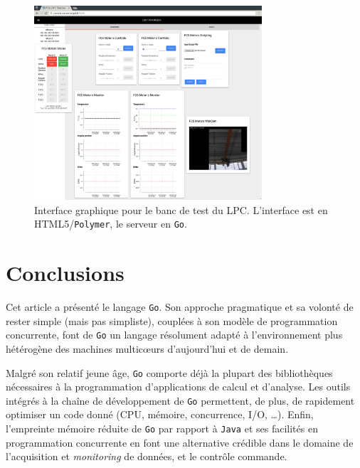 \documentclass[a4paper,french]{article}
\begin{document}
\begin{figure}[h]
	\begin{center}
	\includegraphics[width=20pc]{figs/fcs-lsst.png}
	\end{center}
	\caption{\label{fig-fcs-lsst}Interface graphique pour le banc de test du
	LPC. L'interface est en HTML5/\texttt{Polymer}, le serveur en \texttt{Go}.}
\end{figure}

\section*{Conclusions}

Cet article a pr\'esent\'e le langage \texttt{Go}.
Son approche pragmatique et sa volont\'e de rester simple (mais pas simpliste),
coupl\'ees \`a son mod\`ele de programmation concurrente, font de \texttt{Go} un
langage r\'esolument adapt\'e \`a l'environnement plus h\'et\'erog\`ene des
machines multic\oe urs d'aujourd'hui et de demain.

Malgr\'e son relatif jeune \^age, \texttt{Go} comporte d\'ej\`a la plupart des
biblioth\`eques n\'ecessaires \`a la programmation d'applications de calcul et
d'analyse.
Les outils int\'egr\'es \`a la cha\^ine de d\'eveloppement de \texttt{Go}
permettent, de plus, de rapidement optimiser un code donn\'e (CPU, m\'emoire,
concurrence, I/O, \ldots).
Enfin, l'empreinte m\'emoire r\'eduite de \texttt{Go} par rapport \`a
\texttt{Java} et ses facilit\'es en programmation concurrente en font une
alternative cr\'edible dans le domaine de l'acquisition et \emph{monitoring}
de donn\'ees, et le contr\^ole commande.
\end{document}
